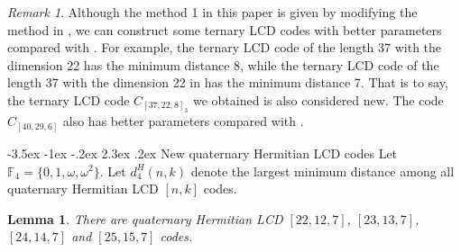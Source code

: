 \documentclass[12pt,twoside]{article}
\makeatletter
\renewcommand\section{\@startsection {section}{1}{\z@}%
                                   {-3.5ex \@plus -1ex \@minus -.2ex}%
                                   {2.3ex \@plus.2ex}%
                                   {\normalfont\large\bfseries}}
\newcommand{\F}{\mathbb{F}}
\theoremstyle{plain}
\newtheorem{lem}[theorem]{Lemma}
\theoremstyle{definition}
\theoremstyle{remark}
\newtheorem{remark}[theorem]{Remark}
\makeatother
\begin{document}
\begin{remark}
Although the method 1 in this paper is given by modifying the method in \cite{234-lcD}, we can construct some ternary LCD codes with better parameters compared with \cite{234-lcD}.
For example, the ternary LCD code of the length 37 with the dimension 22 has the minimum distance 8, while the ternary LCD code of the length 37 with the dimension 22 in \cite[Corollary 6.3]{234-lcD} has the minimum distance 7. That is to say, the ternary LCD code $C_{[37,22,8]_3}$ we obtained is also considered new.
The code $C_{[40,29,6]}$ also has better parameters compared with \cite[Corollary 6.3]{234-lcD}.
\end{remark}
















\section{New quaternary Hermitian LCD codes}
Let $\F_4=\{0,1,\omega,\omega^2\}$.
Let $d^H_4 (n, k)$ denote the largest minimum distance among all quaternary Hermitian LCD $[n, k]$ codes.


\begin{lem}\label{H-22,23,24}
There are quaternary Hermitian LCD $[22,12,7]$, $[23,13,7]$, $[24,14,7]$ and $[25,15,7]$ codes.
\end{lem}
\end{document}
